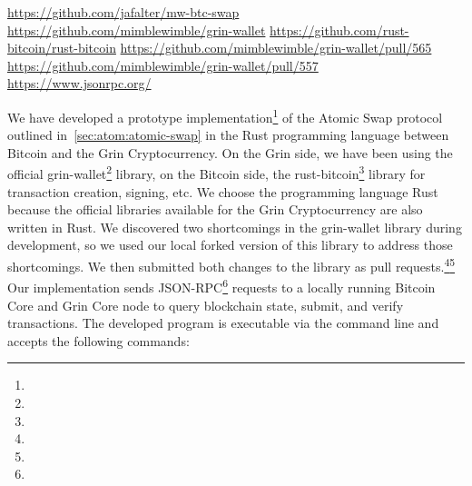 \urldef\urlgithub\url{https://github.com/jafalter/mw-btc-swap}
\urldef\urlgrinwallet\url{https://github.com/mimblewimble/grin-wallet}
\urldef\urlrustbitcoin\url{https://github.com/rust-bitcoin/rust-bitcoin}
\urldef\urlprone\url{https://github.com/mimblewimble/grin-wallet/pull/565}
\urldef\urlprtwo\url{https://github.com/mimblewimble/grin-wallet/pull/557}
\urldef\urljsonrpc\url{https://www.jsonrpc.org/}

We have developed a prototype implementation\footnote{\urlgithub} of the Atomic Swap protocol outlined in~\cref{sec:atom:atomic-swap} in the Rust programming language between Bitcoin and the Grin Cryptocurrency.
On the Grin side, we have been using the official grin-wallet\footnote{\urlgrinwallet} library, on the Bitcoin side, the rust-bitcoin\footnote{\urlrustbitcoin} library for transaction creation, signing, etc.
We choose the programming language Rust because the official libraries available for the Grin Cryptocurrency are also written in Rust.
We discovered two shortcomings in the grin-wallet library during development, so we used our local forked version of this library to address those shortcomings.
We then submitted both changes to the library as pull requests.\footnote{\urlprone}\footnote{\urlprtwo}
Our implementation sends JSON-RPC\footnote{\urljsonrpc} requests to a locally running Bitcoin Core and Grin Core node to query blockchain state, submit, and verify transactions.
The developed program is executable via the command line and accepts the following commands:
